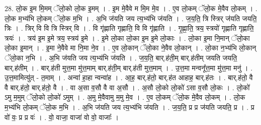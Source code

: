 \documentclass[17pt]{extarticle}
\begin{document}
28. लो॒क इ॒म मि॒मम् ॅलो॒को लो॒क इ॒मम् । . इ॒म मे॒वैवे म मि॒म मे॒व । . ए॒व लो॒कम् ॅलो॒क मे॒वैव लो॒कम् । . लो॒क म॒भ्य॑भि लो॒कम् ॅलो॒क म॒भि । . अ॒भि ज॑यति जय त्य॒भ्य॑भि ज॑यति । . ज॒य॒ति॒ त्रि स्त्रिर् ज॑यति जयति॒ त्रिः । . त्रिर् वि वि त्रि स्त्रिर् वि । . वि गृ॑ह्णाति गृह्णाति॒ वि वि गृ॑ह्णाति । . गृ॒ह्णा॒ति॒ त्रय॒ स्त्रयो॑ गृह्णाति गृह्णाति॒ त्रयः॑ । . त्रय॑ इ॒म इ॒मे त्रय॒ स्त्रय॑ इ॒मे । . इ॒मे लो॒का लो॒का इ॒म इ॒मे लो॒काः । . लो॒का इ॒मा नि॒मान् ॅलो॒का लो॒का इ॒मान् । . इ॒मा ने॒वैवे मा नि॒मा ने॒व । . ए॒व लो॒कान् ॅलो॒का ने॒वैव लो॒कान् । . लो॒का न॒भ्य॑भि लो॒कान् ॅलो॒का न॒भि । . अ॒भि ज॑यति जय त्य॒भ्य॑भि ज॑यति । . ज॒य॒ति॒ बार्.ह॑ती॒म् बार्.ह॑तीम् जयति जयति॒ बार्.ह॑तीम् । . बार्.ह॑ती मुत्त॒मा मु॑त्त॒माम् बार्.ह॑ती॒म् बार्.ह॑ती मुत्त॒माम् । . उ॒त्त॒मा मन्वनू᳚त्त॒मा मु॑त्त॒मा मनु॑ । . उ॒त्त॒मामित्यु॑त् - त॒माम् । . अन्वा॑ हा॒हा न्वन्वा॑ह । . आ॒ह॒ बार्.ह॑तो॒ बार्.ह॑त आहाह॒ बार्.ह॑तः । . बार्.ह॑तो॒ वै वै बार्.ह॑तो॒ बार्.ह॑तो॒ वै । . वा अ॒सा व॒सौ वै वा अ॒सौ । . अ॒सौ लो॒को लो॒को॑ ऽसा व॒सौ लो॒कः । . लो॒को॑ ऽमु म॒मुम् ॅलो॒को लो॒को॑ ऽमुम् । . अ॒मु मे॒वैवामु म॒मु मे॒व । . ए॒व लो॒कम् ॅलो॒क मे॒वैव लो॒कम् । . लो॒क म॒भ्य॑भि लो॒कम् ॅलो॒क म॒भि । . अ॒भि ज॑यति जय त्य॒भ्य॑भि ज॑यति । . ज॒य॒ति॒ प्र प्र ज॑यति जयति॒ प्र । . प्र वो॑ वः॒ प्र प्र वः॑ । . वो॒ वाजा॒ वाजा॑ वो वो॒ वाजाः᳚ । \newline
\end{document}
